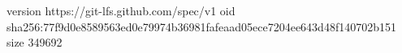 version https://git-lfs.github.com/spec/v1
oid sha256:77f9d0e8589563ed0e79974b36981fafeaad05ece7204ee643d48f140702b151
size 349692

